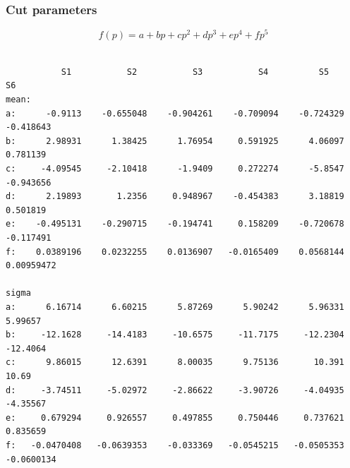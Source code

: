 \subsubsection{Cut parameters}\label{sec:dtp_parameters}
$$
f(p) = a + bp + cp^2 + dp^3 + ep^4 + fp^5
$$
\begin{verbatim}

           S1           S2           S3           S4          S5            S6
mean:
a:      -0.9113    -0.655048    -0.904261    -0.709094    -0.724329    -0.418643
b:      2.98931      1.38425      1.76954     0.591925      4.06097     0.781139
c:     -4.09545     -2.10418      -1.9409     0.272274      -5.8547    -0.943656
d:      2.19893       1.2356     0.948967    -0.454383      3.18819     0.501819
e:    -0.495131    -0.290715    -0.194741     0.158209    -0.720678    -0.117491
f:    0.0389196    0.0232255    0.0136907   -0.0165409    0.0568144   0.00959472

sigma 
a:      6.16714      6.60215      5.87269      5.90242      5.96331      5.99657
b:     -12.1628     -14.4183     -10.6575     -11.7175     -12.2304     -12.4064
c:      9.86015      12.6391      8.00035      9.75136       10.391        10.69
d:     -3.74511     -5.02972     -2.86622     -3.90726     -4.04935     -4.35567
e:     0.679294     0.926557     0.497855     0.750446     0.737621     0.835659
f:   -0.0470408   -0.0639353    -0.033369   -0.0545215   -0.0505353   -0.0600134

\end{verbatim}














